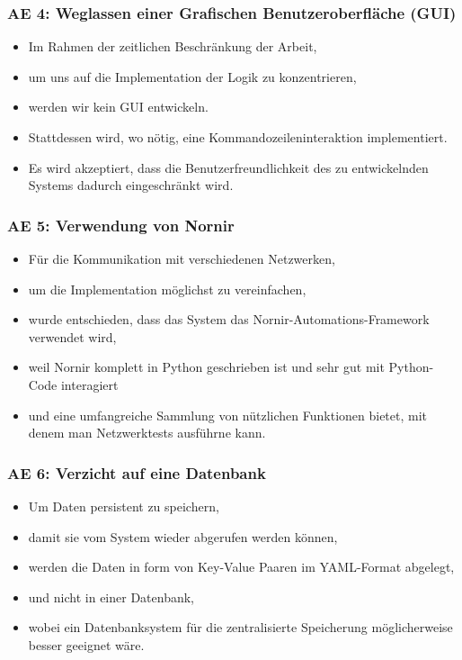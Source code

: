 \documentclass[
	ngerman,
	toc=listof, %
	toc=bibliography, %
	footnotes=multiple, %
	parskip=half, %
	numbers=noendperiod %
]{scrartcl}
\begin{document}
		\subsubsection{AE 4: Weglassen einer Grafischen Benutzeroberfläche (GUI)}
		\begin{itemize}
			\item Im Rahmen der zeitlichen Beschränkung der Arbeit,
			\item um uns auf die Implementation der Logik zu konzentrieren,
			\item werden wir kein GUI entwickeln.
			\item Stattdessen wird, wo nötig, eine Kommandozeileninteraktion implementiert.
			\item Es wird akzeptiert, dass die Benutzerfreundlichkeit des zu entwickelnden Systems dadurch eingeschränkt wird.
		\end{itemize}

		\subsubsection{AE 5: Verwendung von Nornir}
		\begin{itemize}
			\item Für die Kommunikation mit verschiedenen Netzwerken,
			\item um die Implementation möglichst zu vereinfachen,
			\item wurde entschieden, dass das System das Nornir-Automations-Framework verwendet wird,
			\item weil Nornir komplett in Python geschrieben ist und sehr gut mit Python-Code interagiert
			\item und eine umfangreiche Sammlung von nützlichen Funktionen bietet, mit denem man Netzwerktests ausführne kann.
		\end{itemize}

		\subsubsection{AE 6: Verzicht auf eine Datenbank}
		\begin{itemize}
			\item Um Daten persistent zu speichern, 
			\item damit sie vom System wieder abgerufen werden können,
			\item werden die Daten in form von Key-Value Paaren im YAML-Format abgelegt,
			\item und nicht in einer Datenbank,
			\item wobei ein Datenbanksystem für die zentralisierte Speicherung möglicherweise besser geeignet wäre.
		\end{itemize}
		\newpage
\end{document}
